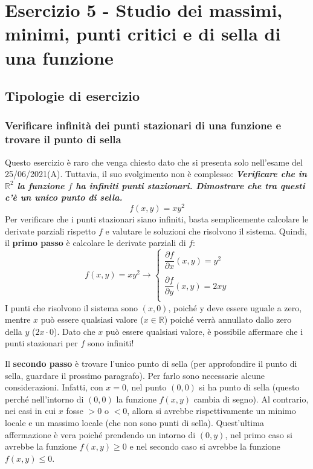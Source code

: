 \documentclass[a4paper]{article}
\begin{document}
	\section{Esercizio 5 - Studio dei massimi, minimi, punti critici e di sella di una funzione}
	
	\subsection{Tipologie di esercizio}

	\subsubsection{Verificare infinità dei punti stazionari di una funzione e trovare il punto di sella}\label{par: verificare infinità dei punti stazionari di una funzione e trovare il punto di sella}

	Questo esercizio è raro che venga chiesto dato che si presenta solo nell'esame del 25/06/2021(A). Tuttavia, il suo svolgimento non è complesso: \textcolor{Green4}{\textbf{\emph{Verificare che in $\mathbb{R}^{2}$ la funzione $f$ ha infiniti punti stazionari. Dimostrare che tra questi c'è un unico punto di sella.}}
	\begin{equation*}
		f\left(x,y\right) = xy^{2}
	\end{equation*}}
	Per verificare che i punti stazionari siano infiniti, basta semplicemente calcolare le derivate parziali rispetto $f$ e valutare le soluzioni che risolvono il sistema. Quindi, il \textbf{primo passo} è calcolare le derivate parziali di $f$:
	\begin{equation*}
		f\left(x,y\right) = xy^{2} \longrightarrow
		\begin{cases}
			\dfrac{\partial f}{\partial x}\left(x,y\right) = y^{2} \\
			\\
			\dfrac{\partial f}{\partial y}\left(x,y\right) = 2xy \\
		\end{cases}
	\end{equation*}
	I punti che risolvono il sistema sono $\left(x, 0\right)$, poiché y deve essere uguale a zero, mentre $x$ può essere qualsiasi valore ($x \in \mathbb{R}$) poiché verrà annullato dallo zero della $y$ ($2x \cdot 0$). Dato che $x$ può essere qualsiasi valore, è possibile affermare che i punti stazionari per $f$ sono infiniti!\newline

	\noindent
	Il \textbf{secondo passo} è trovare l'unico punto di sella (per approfondire il punto di sella, guardare il prossimo paragrafo). Per farlo sono necessarie alcune considerazioni. Infatti, con $x = 0$, nel punto $\left(0,0\right)$ si ha punto di sella (questo perché nell'intorno di $\left(0,0\right)$ la funzione $f\left(x,y\right)$ cambia di segno). Al contrario, nei casi in cui $x$ fosse $> 0$ o $< 0$, allora si  avrebbe rispettivamente un minimo locale e un massimo locale (che non sono punti di sella). Quest'ultima affermazione è vera poiché prendendo un intorno di $\left(0,y\right)$, nel primo caso si avrebbe la funzione $f\left(x,y\right) \ge 0$ e nel secondo caso si avrebbe la funzione $f\left(x,y\right) \le 0$.\newpage
\end{document}
